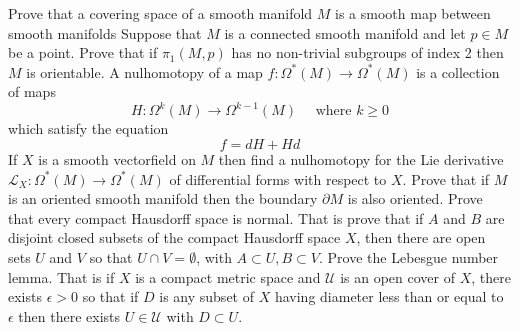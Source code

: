 \documentclass[10pt]{article}
\begin{document}
\newpage
Prove that a covering space of a smooth manifold $M$ is a smooth map between smooth manifolds
\newpage
Suppose that $M$ is a connected smooth manifold and let $p \in M$ be a point. Prove that if $\pi_{1}(M, p)$ has no non-trivial subgroups of index 2 then $M$ is orientable.
\newpage
A nulhomotopy of a map $f: \Omega^{*}(M) \rightarrow \Omega^{*}(M)$ is a collection of maps
$$
H: \Omega^{k}(M) \rightarrow \Omega^{k-1}(M) \quad \text { where } k \geq 0
$$
which satisfy the equation
$$
f=d H+H d
$$
If $X$ is a smooth vectorfield on $M$ then find a nulhomotopy for the Lie derivative $\mathcal{L}_{X}: \Omega^{*}(M) \rightarrow \Omega^{*}(M)$ of differential forms with respect to $X$.
\newpage
Prove that if $M$ is an oriented smooth manifold then the boundary $\partial M$ is also oriented.
\newpage
   Prove that every compact Hausdorff space is normal. That is prove that if $A$ and $B$ are disjoint closed subsets of the compact Hausdorff space $X$, then there are open sets $U$ and $V$ so that $U \cap V=\emptyset$, with $A \subset U, B \subset V$.
\newpage
   Prove the Lebesgue number lemma. That is if $X$ is a compact metric space and $\mathcal{U}$ is an open cover of $X$, there exists $\epsilon>0$ so that if $D$ is any subset of $X$ having diameter less than or equal to $\epsilon$ then there exists $U \in \mathcal{U}$ with $D \subset U$.
\end{document}
